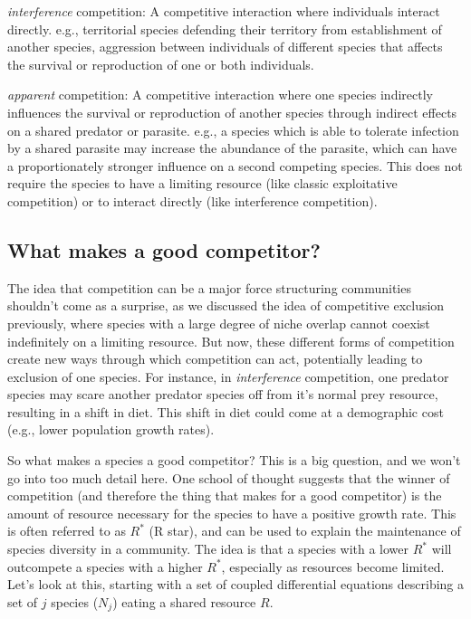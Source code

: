 \documentclass[12pt]{article}
\begin{document}
\textit{interference} competition: A competitive interaction where individuals interact directly. e.g., territorial species defending their territory from establishment of another species, aggression between individuals of different species that affects the survival or reproduction of one or both individuals. 


\textit{apparent} competition: A competitive interaction where one species indirectly influences the survival or reproduction of another species through indirect effects on a shared predator or parasite. e.g., a species which is able to tolerate infection by a shared parasite may increase the abundance of the parasite, which can have a proportionately stronger influence on a second competing species. This does not require the species to have a limiting resource (like classic exploitative competition) or to interact directly (like interference competition). 




\subsection*{What makes a good competitor?}
The idea that competition can be a major force structuring communities shouldn't come as a surprise, as we discussed the idea of competitive exclusion previously, where species with a large degree of niche overlap cannot coexist indefinitely on a limiting resource. But now, these different forms of competition create new ways through which competition can act, potentially leading to exclusion of one species. For instance, in \textit{interference} competition, one predator species may scare another predator species off from it's normal prey resource, resulting in a shift in diet. This shift in diet could come at a demographic cost (e.g., lower population growth rates). 

So what makes a species a good competitor? This is a big question, and we won't go into too much detail here. One school of thought suggests that the winner of competition (and therefore the thing that makes for a good competitor) is the amount of resource necessary for the species to have a positive growth rate. This is often referred to as $R^{*}$ (R star), and can be used to explain the maintenance of species diversity in a community. The idea is that a species with a lower $R^{*}$ will outcompete a species with a higher $R^{*}$, especially as resources become limited. Let's look at this, starting with a set of coupled differential equations describing a set of $j$ species ($N_j$) eating a shared resource $R$. 
\end{document}

